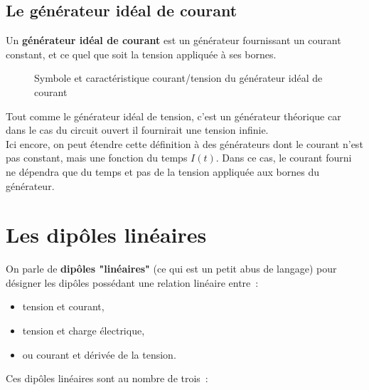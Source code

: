 \subsection{ Le générateur idéal de courant }

Un \textbf{générateur idéal de courant} est un générateur fournissant un courant constant, et ce quel que soit la tension appliquée à ses bornes.

\begin{figure}[!h]
\begin{center}

\hspace{1cm}

\end{center}
\caption{ Symbole et caractéristique courant/tension du générateur idéal de courant}
\end{figure}

Tout comme le générateur idéal de tension, c'est un générateur théorique car dans le cas du circuit ouvert il fournirait une tension infinie.\\

Ici encore, on peut étendre cette définition à des générateurs dont le courant n'est pas constant, mais une fonction du temps $I(t)$. Dans ce cas, le courant fourni ne dépendra que du temps et pas de la tension appliquée aux bornes du générateur.


\section{ Les dipôles linéaires }

On parle de \textbf{dipôles "linéaires"} (ce qui est un petit abus de langage) pour désigner les dipôles possédant une relation linéaire entre~:\\
\begin{itemize}
\item tension et courant, 
\item tension et charge électrique,
\item ou courant et dérivée de la tension.\\
\end{itemize}

Ces dipôles linéaires sont au nombre de trois~: \\

